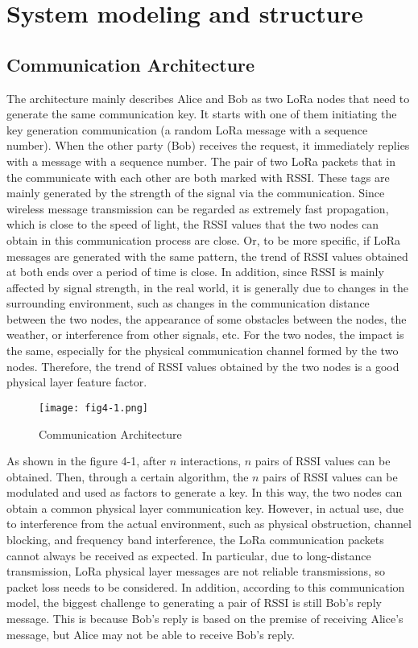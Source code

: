 
\chapter{System modeling and structure}

\section{Communication Architecture}

The architecture mainly describes Alice and Bob as two LoRa nodes that need to generate the same communication key. It starts with one of them initiating the key generation communication (a random LoRa message with a sequence number). When the other party (Bob) receives the request, it immediately replies with a message with a sequence number.
The pair of two LoRa packets that in the communicate with each other are both marked with RSSI. These tags are mainly generated by the strength of the signal via the communication. Since wireless message transmission can be regarded as extremely fast propagation, which is close to the speed of light, the RSSI values that the two nodes can obtain in this communication process are close. Or, to be more specific, if LoRa messages are generated with the same pattern, the trend of RSSI values obtained at both ends over a period of time is close.
In addition, since RSSI is mainly affected by signal strength, in the real world, it is generally due to changes in the surrounding environment, such as changes in the communication distance between the two nodes, the appearance of some obstacles between the nodes, the weather, or interference from other signals, etc. For the two nodes, the impact is the same, especially for the physical communication channel formed by the two nodes. Therefore, the trend of RSSI values obtained by the two nodes is a good physical layer feature factor.
\begin{figure}
  \centering
  \texttt{[image: fig4-1.png]}
  \caption{Communication Architecture}
  \label{fig:4-1}
\end{figure}
As shown in the figure 4-1, after $n$ interactions, $n$ pairs of RSSI values can be obtained. Then, through a certain algorithm, the $n$ pairs of RSSI values can be modulated and used as factors to generate a key. In this way, the two nodes can obtain a common physical layer communication key. 
However, in actual use, due to interference from the actual environment, such as physical obstruction, channel blocking, and frequency band interference, the LoRa communication packets cannot always be received as expected. In particular, due to long-distance transmission, LoRa physical layer messages are not reliable transmissions, so packet loss needs to be considered. In addition, according to this communication model, the biggest challenge to generating a pair of RSSI is still Bob's reply message. This is because Bob's reply is based on the premise of receiving Alice's message, but Alice may not be able to receive Bob's reply.

